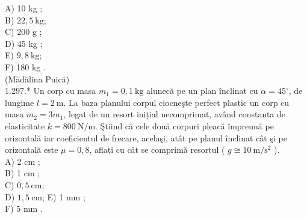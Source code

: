 {A) 10 kg ;\\
B) $22,5 \mathrm{~kg}$;\\
C) 200 g ;\\
D) 45 kg ;\\
E) $9,8 \mathrm{~kg}$;\\
F) 180 kg .\\
(Mădălina Puică)\\
1.297.* Un corp cu masa $m_{1}=0,1 \mathrm{~kg}$ alunecă pe un plan înclinat cu $\alpha=45^{\circ}$, de lungime $l=2 \mathrm{~m}$. La baza planului corpul ciocneşte perfect plastic un corp cu masa $m_{2}=3 m_{1}$, legat de un resort inițial necomprimat, având constanta de elasticitate $k=800 \mathrm{~N} / \mathrm{m}$. Ştiind că cele două corpuri pleacă împreună pe orizontală iar coeficientul de frecare, acelaşi, atât pe planul înclinat cât şi pe orizontală este $\mu=0,8$, aflați cu cât se comprimă resortul ( $g \cong 10 \mathrm{~m} / \mathrm{s}^{2}$ ).\\
A) 2 cm ;\\
B) 1 cm ;\\
C) $0,5 \mathrm{~cm}$;\\
D) $1,5 \mathrm{~cm}$; E) 1 mm ;\\
F) 5 mm .

}
